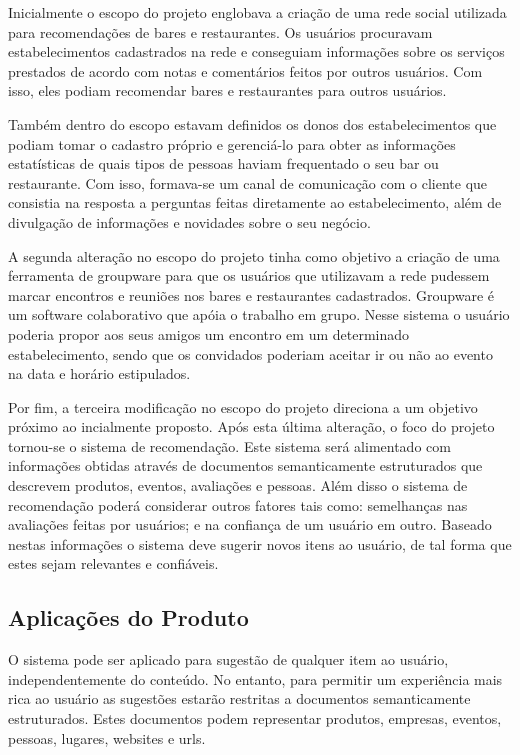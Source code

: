  Inicialmente o escopo do projeto englobava a criação de uma rede social utilizada para recomendações de bares e restaurantes. Os usuários procuravam estabelecimentos cadastrados na rede e conseguiam informações sobre os serviços prestados de acordo com notas e comentários feitos por outros usuários. Com isso, eles podiam recomendar bares e restaurantes para outros usuários.

 Também dentro do escopo estavam definidos os donos dos estabelecimentos que podiam tomar o cadastro próprio e gerenciá-lo para obter as informações estatísticas de quais tipos de pessoas haviam frequentado o seu bar ou restaurante. Com isso, formava-se um canal de comunicação com o cliente que consistia na resposta a perguntas feitas diretamente ao estabelecimento, além de divulgação de informações e novidades sobre o seu negócio.

 A segunda alteração no escopo do projeto tinha como objetivo a criação de uma ferramenta de groupware para que os usuários que utilizavam a rede pudessem marcar encontros e reuniões nos bares e restaurantes cadastrados. Groupware é um software colaborativo que apóia o trabalho em grupo. Nesse sistema o usuário poderia propor aos seus amigos um encontro em um determinado estabelecimento, sendo que os convidados poderiam aceitar ir ou não ao evento na data e horário estipulados.

 Por fim, a terceira modificação no escopo do projeto direciona a um objetivo próximo ao incialmente proposto. Após esta última alteração, o foco do projeto tornou-se o sistema de recomendação. Este sistema será alimentado com informações obtidas através de documentos semanticamente estruturados que descrevem produtos, eventos, avaliações e pessoas. Além disso o sistema de recomendação poderá considerar outros fatores tais como: semelhanças nas avaliações feitas por usuários; e na confiança de um usuário em outro. Baseado nestas informações o sistema deve sugerir novos itens ao usuário, de tal forma que estes sejam relevantes e confiáveis.

\subsection{Aplicações do Produto}
 
 O sistema pode ser aplicado para sugestão de qualquer item ao usuário, independentemente do conteúdo. No entanto, para permitir um experiência mais rica ao usuário as sugestões estarão restritas a documentos semanticamente estruturados. Estes documentos podem representar produtos, empresas, eventos, pessoas, lugares, websites e urls.
 
